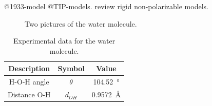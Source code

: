 @1933-model @TIP-models.  \citet{Vega2011} review rigid non-polarizable models.

\begin{figure}
\begin{minipage}{\textwidth}
\end{minipage}
\caption{Two pictures of the water molecule.}
\label{fig:water_molecule}
\end{figure}

\begin{table}[h!tb]
\caption{Experimental data for the water molecule.}
\label{tb:intro:h2odata}
\begin{center}
\begin{tabular}{c|c|c}
Description & Symbol & Value \\
\hline
H-O-H angle & $\theta$ & \SI{104.52}{\degree} \\
Distance O-H & $d_{OH}$ & \SI{0.9572}{\angstrom} \\
\end{tabular}
\end{center}
\end{table}


